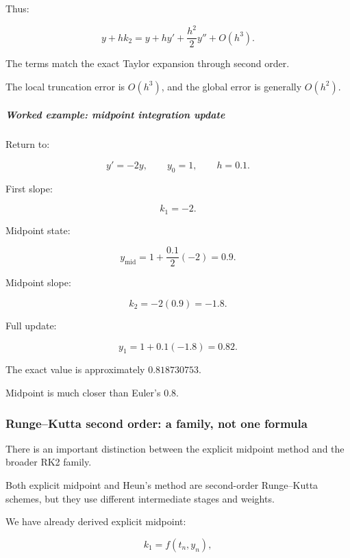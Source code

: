 Thus:

\[
y+hk_2 = y+hy'+\frac{h^2}{2}y''+O(h^3).
\]

The terms match the exact Taylor expansion through second order.

The local truncation error is \(O(h^3)\), and the global error is generally \(O(h^2)\).

\begin{allmightroleexample}

\subparagraph{Worked example: midpoint integration update}\label{02-foundations-ii-ch025-worked-example-midpoint-integration-update}

\hypertarget{02-foundations-ii-ch025-worked-example-midpoint-integration-update}{}

Return to:

\end{allmightroleexample}

\[
y'=-2y,\qquad y_0=1,\qquad h=0.1.
\]

First slope:

\[
k_1=-2.
\]

Midpoint state:

\[
y_{\mathrm{mid}} = 1+\frac{0.1}{2}(-2) =0.9.
\]

Midpoint slope:

\[
k_2=-2(0.9)=-1.8.
\]

Full update:

\[
y_1=1+0.1(-1.8)=\boxed{0.82}.
\]

The exact value is approximately \(0.818730753\).

Midpoint is much closer than Euler's \(0.8\).

\subsubsection{Runge--Kutta second order: a family, not one formula}\label{02-foundations-ii-ch025-rungekutta-second-order-a-family-not-one-formula}

\hypertarget{02-foundations-ii-ch025-rungekutta-second-order-a-family-not-one-formula}{}

There is an important distinction between the explicit midpoint method and the broader RK2 family.

Both explicit midpoint and Heun's method are second-order Runge--Kutta schemes, but they use different intermediate stages and weights.

We have already derived explicit midpoint:

\[
k_1=f(t_n,y_n),
\]


